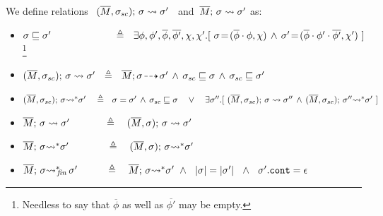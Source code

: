  
\begin{definition}
\label{def:shallow:term}
We define relations \    $(\overline{M}, \sigma_{sc});\, {\sigma} \rightsquigarrow \sigma'$ \ and\  $\overline{M};\, {\sigma} \rightsquigarrow \sigma'$ as:

\begin{itemize}
\item
 $\EarlierS {\sigma}  {\sigma'} \ \ \ \ \ \  \ \ \ \ \ \ \ \ \ \  \ \ \  \triangleq \ \ %
 {\exists  \phi, \phi',\overline \phi, \overline {\phi'},\chi, \chi'.[\  \sigma\!=\!({\overline \phi\cdot \phi},\chi)\, \wedge\, \sigma'\!=\!(\overline \phi\cdot \phi'\cdot \overline {\phi'},\chi')\ ] } $\footnote{Needless to say that   $\overline \phi$ as well as ${\overline {\phi'}}$ may be empty.}
 
 \item
{ $(\overline{M}, \sigma_{sc});\, {\sigma} \rightsquigarrow \sigma'  \  \   \triangleq \ \    \overline{M};\sigma\! \dashrightarrow\! {\sigma'} \, \wedge\, 
  {\sigma_{sc}} \sqsubseteq {\sigma} \, \wedge\,   {\sigma_{sc}} \sqsubseteq {\sigma'} $}
\item
 $(\overline{M}, \sigma_{sc});\, {\sigma} {\rightsquigarrow^*} \sigma' \ \ \ \triangleq \ \  \sigma=\sigma' \, \wedge\,   {\sigma_{sc}} \sqsubseteq {\sigma}\  \ \ \vee
 \ \ \ \exists \sigma''.[\ (\overline{M}, \sigma_{sc});\, {\sigma} \rightsquigarrow \sigma'' \, \wedge\, 
(\overline{M}, \sigma_{sc});\, {\sigma''} {\rightsquigarrow^*} \sigma'\ ]$
 \item
{  $\overline{M};\, {\sigma} \rightsquigarrow \sigma' \ \  \ \ \ \ \   \,   \ \ \ \triangleq \ \ \  (\overline{M}, \sigma);\, {\sigma} \rightsquigarrow \sigma'$}
  \item
{  $\overline{M};\, {\sigma} {\rightsquigarrow^*} \sigma'   \ \ \ \ \ \ \,  \ \ \ \  \ \triangleq  \ \ \  (\overline{M}, \sigma);\, {\sigma} {\rightsquigarrow^*} \sigma'$}\ \  
\item
  $\overline{M};\, {\sigma} {\rightsquigarrow^*}\!\!_{\mathit{fin}}\, \sigma'   \ \ \ \ \  \,  \ \  \ \triangleq  \ \ \  \overline{M};\, {\sigma} {\rightsquigarrow^*} \sigma'  \ \wedge\ \
 {|\sigma| = |\sigma'| \ \ \wedge \ \ \sigma'.\mbox{\normalfont{\texttt{cont}}}=\epsilon  } $
 \end{itemize}
\end{definition}


